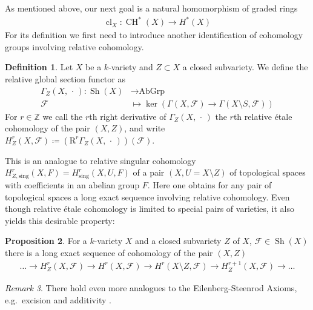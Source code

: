 \documentclass[english]{scrartcl}
\theoremstyle{definition}
\newtheorem{Def}{Definition}[section]
\newtheorem{Prop}[Def]{Proposition}
\theoremstyle{remark}
\newtheorem{Rem}[Def]{Remark}
\newcommand*{\Z}{\mathds{Z}}
\newcommand*{\F}{\mathcal{F}} %
\DeclareMathOperator{\Sh}{Sh} %
\newcommand*{\forexample}{e.g.\ }
\newcommand*{\argreplacement}{\,\cdot\,} %
\DeclareMathOperator{\CH}{CH} %
\DeclareMathOperator{\CL}{cl} %
\begin{document}
As mentioned above, our next goal is a natural homomorphism of graded rings
\begin{gather*}
  \CL_X\colon \CH^*(X)\rightarrow H^*(X)
\end{gather*}
For its definition we first need to introduce another identification
of cohomology groups involving relative cohomology.

\begin{Def}\label{def:relcoh}
  Let $X$ be a $k$-variety and $Z\subset X$ a closed subvariety.
  We define the relative global section functor as
  \begin{align*}
    \Gamma_Z(X,\argreplacement) \colon \Sh(X) &\longrightarrow \text{AbGrp}\\
    \F &\longmapsto \ker\left(\Gamma(X,\F)\to \Gamma(X\setminus S,\F)\right)
  \end{align*}
  For $r\in\Z$ we call the $r$th right derivative of
  $\Gamma_Z(X,\argreplacement)$ the $r$th relative étale cohomology of the pair
  $(X,Z)$, and write
  $H_Z^r(X,\F)\coloneqq\left(\mathrm R^r\Gamma_Z(X,\argreplacement)\right)(\F)$.
\end{Def}
This is an analogue to relative singular cohomology
$H_{Z,\text{sing}}^r(X,F)=H_{\text{sing}}^r(X,U,F)$
of a pair $(X,U=X\setminus Z)$ of topological spaces with coefficients
in an abelian group $F$. Here one obtains for any pair of topological
spaces a long exact sequence involving relative cohomology.
Even though relative étale cohomology is limited to special pairs of
varieties, it also yields this desirable property:
\begin{Prop}\label{lesrelcoh}
  For a $k$-variety $X$ and a closed subvariety $Z$ of $X$,
  $\F\in\Sh(X)$ there is a long exact sequence of cohomology of the
  pair $(X,Z)$
  \begin{gather*}
    \dotsc
    \to H_Z^r(X,\F)
    \to H^r(X,\F)
    \to H^r(X\setminus Z,\F)
    \to H_Z^{r+1}(X,\F)
    \to \dotsc
  \end{gather*}
\end{Prop}
\begin{Rem}
  There hold even more analogues to the Eilenberg-Steenrod Axioms,
  \forexample excision and additivity \cite[][Chap.~9]{milne}.
\end{Rem}
\end{document}
